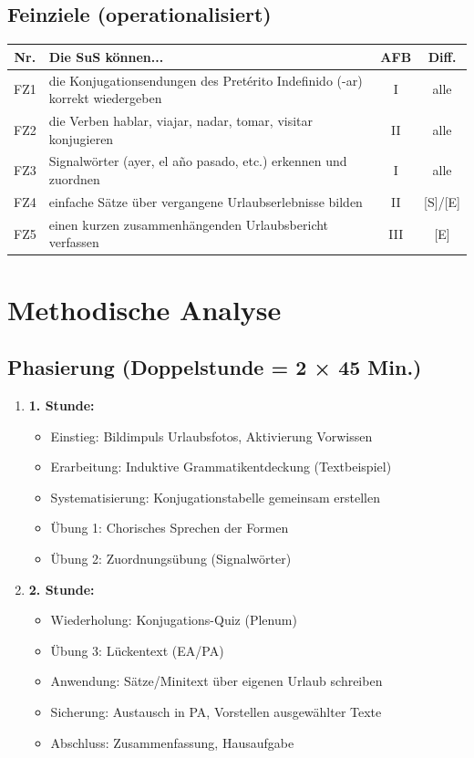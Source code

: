 \documentclass[11pt,a4paper]{article}
\begin{document}
\subsection{Feinziele (operationalisiert)}
\begin{tabular}{|c|p{8cm}|c|c|}
\hline
\textbf{Nr.} & \textbf{Die SuS können...} & \textbf{AFB} & \textbf{Diff.} \\
\hline
FZ1 & die Konjugationsendungen des Pretérito Indefinido (-ar) korrekt wiedergeben & I & alle \\
\hline
FZ2 & die Verben hablar, viajar, nadar, tomar, visitar konjugieren & II & alle \\
\hline
FZ3 & Signalwörter (ayer, el año pasado, etc.) erkennen und zuordnen & I & alle \\
\hline
FZ4 & einfache Sätze über vergangene Urlaubserlebnisse bilden & II & [S]/[E] \\
\hline
FZ5 & einen kurzen zusammenhängenden Urlaubsbericht verfassen & III & [E] \\
\hline
\end{tabular}

\section{Methodische Analyse}

\subsection{Phasierung (Doppelstunde = 2 × 45 Min.)}
\begin{enumerate}
    \item \textbf{1. Stunde:}
    \begin{itemize}
        \item Einstieg: Bildimpuls Urlaubsfotos, Aktivierung Vorwissen
        \item Erarbeitung: Induktive Grammatikentdeckung (Textbeispiel)
        \item Systematisierung: Konjugationstabelle gemeinsam erstellen
        \item Übung 1: Chorisches Sprechen der Formen
        \item Übung 2: Zuordnungsübung (Signalwörter)
    \end{itemize}
    \item \textbf{2. Stunde:}
    \begin{itemize}
        \item Wiederholung: Konjugations-Quiz (Plenum)
        \item Übung 3: Lückentext (EA/PA)
        \item Anwendung: Sätze/Minitext über eigenen Urlaub schreiben
        \item Sicherung: Austausch in PA, Vorstellen ausgewählter Texte
        \item Abschluss: Zusammenfassung, Hausaufgabe
    \end{itemize}
\end{enumerate}
\end{document}
